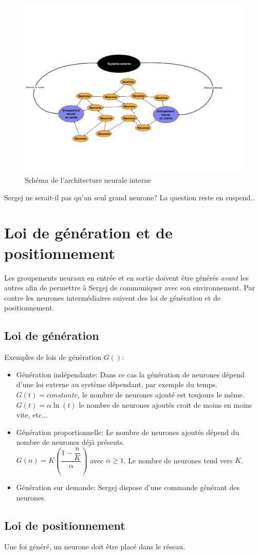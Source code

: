 \documentclass[a4paper]{article}
\begin{document}
\begin{figure}
\centering
\includegraphics[scale=0.5]{Groupement_neural}
\caption{Schéma de l'architecture neurale interne}
\end{figure}

Sergej ne serait-il pas qu'un seul grand neurone? La question reste en suspend..

\section{Loi de génération et de positionnement}

Les groupements neuraux en entrée et en sortie doivent être générés \textit{avant} les autres afin de permettre à Sergej de communiquer avec son environnement. Par contre les neurones intermédiaires suivent des loi de génération et de positionnement.
\subsection{Loi de génération}
Exemples de lois de génération $G()$:
\begin{itemize}
\item Génération indépendante: Dans ce cas la génération de neurones dépend d'une loi externe au système dépendant, par exemple du temps. \\$G(t)=constante$, le nombre de neurones ajouté est toujours le même.\\
 $G(t)=\alpha\ln (t)$ le nombre de neurones ajoutés croit de moins en moins vite, etc...
\item Génération proportionnelle: Le nombre de neurones ajoutés dépend du nombre de neurones déjà présents.\\ $G(n) = K\left(\dfrac{1-\dfrac{n}{K}}{\alpha}\right)$ avec $\alpha\geq1$. Le nombre de neurones tend vers $K$.\\
\item Génération sur demande: Sergej dispose d'une commande générant des neurones.
\end{itemize}
\subsection{Loi de positionnement}

Une foi généré, un neurone doit être placé dans le réseau.
\end{document}
